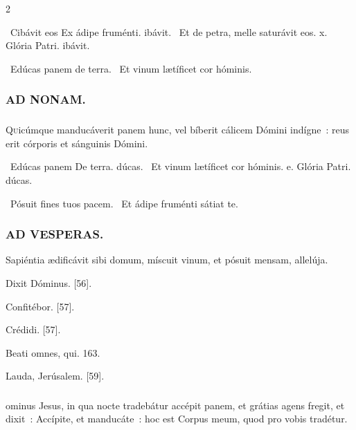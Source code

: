 \documentclass[9pt,twoside]{extarticle}
\begin{document}
\begin{multicols}{2}
{\begin{tightlist}{}
\item {}~Cibávit eos \textred{*} Ex ádipe fruménti. ibávit. ~Et de petra, melle saturávit eos. x. Glória Patri. ibávit.
\item {}~Edúcas panem de terra. ~Et vinum lætíficet cor hóminis.
\end{tightlist}

\subsubsection*{\center \textsc{AD NONAM.}}
\subsubsection*{}
\lettrine{Q}uicúmque manducáverit panem hunc, vel bíberit cálicem Dómini indígne~: reus erit córporis et sánguinis Dómini.

\begin{tightlist}{}
\item {}~Edúcas panem \textred{*} De terra. dúcas. ~Et vinum lætíficet cor hóminis. e. Glória Patri. dúcas.
\item {}~Pósuit fines tuos pacem. ~Et ádipe fruménti sátiat te.
\end{tightlist}

\subsubsection*{\center \textsc{AD VESPERAS.}}
\begin{tightlist}{}
\item {} Sapiéntia ædificávit sibi domum, míscuit vinum, et pósuit mensam, allelúja.
\item {} Dixit Dóminus. [56].
\item {} Confitébor. [57].
\item {} Crédidi. [57].
\item {} Beati omnes, qui. 163.
\item {} Lauda, Jerúsalem. [59].
\end{tightlist}

\subsubsection*{}
ominus Jesus, in qua nocte tradebátur accépit panem, et grátias agens fregit, et dixit~: Accípite, et manducáte~: hoc est Corpus meum, quod pro vobis tradétur.

}
\end{multicols}
\end{document}
